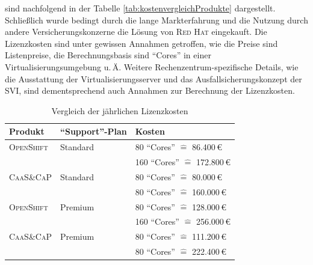 sind nachfolgend in der Tabelle \vref{tab:kostenvergleichProdukte} dargestellt. Schließlich wurde bedingt durch die lange Markterfahrung und die Nutzung durch andere Versicherungskonzerne die Lösung von \textsc{Red Hat} eingekauft. Die Lizenzkosten sind unter gewissen Annahmen getroffen, wie die Preise sind Listenpreise, die Berechnungsbasis sind \enquote{Cores} in einer Virtualisierungsumgebung u.\,Ä. Weitere Rechenzentrum-spezifische Details, wie die Ausstattung der Virtualisierungsserver und das Ausfallsicherungskonzept der \ac{SVI}, sind dementsprechend auch Annahmen zur Berechnung der Lizenzkosten.

\begin{table}[h!]
	\centering
	
	\begin{tabular}{@{}lll@{}}\toprule[1.5pt]
		
		\textbf{Produkt} & \textbf{\enquote{Support}-Plan} & \textbf{Kosten} \\ \midrule
		\textsc{OpenShift} & Standard & 80 \enquote{Cores} $\widehat{=}$  86.400\,\euro \\
		& & 160 \enquote{Cores} $\widehat{=}$  172.800\,\euro \\
		
		\textsc{CaaS}\&\textsc{CaP} & Standard & 80 \enquote{Cores} $\widehat{=}$  80.000\,\euro \\
		& & 80 \enquote{Cores} $\widehat{=}$  160.000\,\euro \\
		
		\textsc{OpenShift} & Premium & 80 \enquote{Cores} $\widehat{=}$  128.000\,\euro \\
		& & 160 \enquote{Cores} $\widehat{=}$  256.000\,\euro \\
		
		\textsc{CaaS}\&\textsc{CaP} & Premium & 80 \enquote{Cores} $\widehat{=}$  111.200\,\euro \\
		& & 80 \enquote{Cores} $\widehat{=}$  222.400\,\euro \\		
		
		\bottomrule[1.5pt]
	\end{tabular}
	
	\caption{Vergleich der jährlichen Lizenzkosten}
	\label{tab:kostenvergleichProdukte}
	
\end{table}
